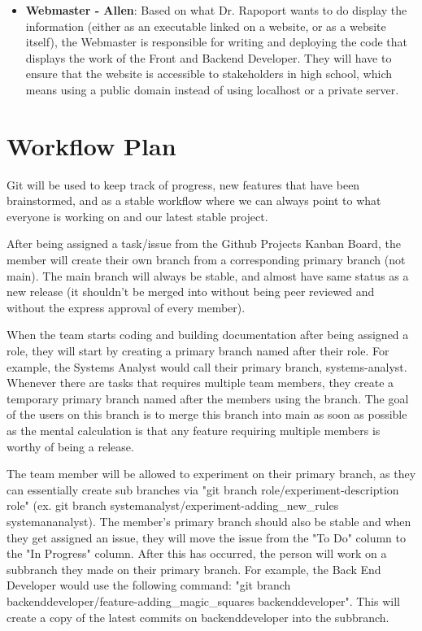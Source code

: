 \documentclass{article}
\begin{document}
\begin {itemize}
\item \textbf{Webmaster - Allen}: Based on what Dr. Rapoport wants to do display the information (either as an executable linked on a website, or as a website itself), the Webmaster is responsible for writing and deploying the code that displays the work of the Front and Backend Developer. They will have to ensure that the website is accessible to stakeholders in high school, which means using a public domain instead of using localhost or a private server. 
\end {itemize}



\section{Workflow Plan}
Git will be used to keep track of progress, new features that have been brainstormed, and as a stable workflow where we can always point to what everyone is working on and our latest stable project.

After being assigned a task/issue from the Github Projects Kanban Board, the member will create their own branch from a corresponding primary branch (not main). 
The main branch will always be stable, and almost have same status as a new release (it shouldn't be merged into without being peer reviewed and without the express approval of every member).

When the team starts coding and building documentation after being assigned a role, they will start by creating a primary branch named after their role. For example, the Systems Analyst would call their primary branch, systems-analyst.
Whenever there are tasks that requires multiple team members, they create a temporary primary branch named after the members using the branch. The goal of the users on this branch is to merge this branch into main as soon as possible as the mental calculation is that any feature requiring multiple members is worthy of being a release. 

The team member will be allowed to experiment on their primary branch, as they can essentially create sub branches via "git branch role/experiment-description role" (ex. git branch systemanalyst/experiment-adding\_new\_rules systemananalyst).
The member's primary branch should also be stable and when they get assigned an issue, they will move the issue from the "To Do" column to the "In Progress" column. After this has occurred, the person will work on a subbranch they made on their primary branch. For example, the Back End Developer would use the following command: "git branch backenddeveloper/feature-adding\_magic\_squares backenddeveloper".
This will create a copy of the latest commits on backenddeveloper into the subbranch. 
\end{document}
